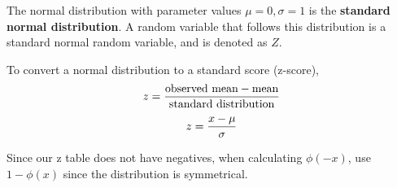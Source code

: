 \documentclass[english, 12pt]{article}
\begin{document}

\begin{defn}
The normal distribution with parameter values $\mu = 0, \sigma = 1$ is the \textbf{standard normal distribution}. A random variable that follows this distribution is a standard normal random variable, and is denoted as $Z$.
\end{defn}

To convert a normal distribution to a standard score (z-score),
\[z = \frac{\text{observed mean} - \text{mean}}{\text{standard distribution}}\]
\[z = \frac{x - \mu}{\sigma}\]


\begin{note}
Since our z table does not have negatives, when calculating $\phi(-x)$, use $1 - \phi(x)$ since the distribution is symmetrical.
\end{note}
\end{document}
